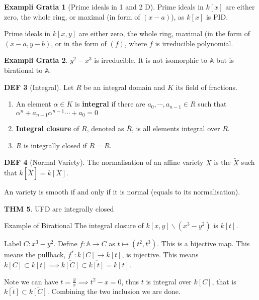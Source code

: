 \documentclass[twocolumn]{article}
\renewcommand{\emph}[1]{{\color{blue!70!black}\sffamily\bfseries #1}}
\newcommand{\A}{\mathbb{A}}
\theoremstyle{definition}
\newtheorem{thm}{THM}
\newtheorem{example}[thm]{Exampli Gratia}
\newtheorem{defi}[thm]{DEF}
\theoremstyle{remark}
\begin{document}
\begin{example}[Prime ideals in 1 and 2 D]
	Prime ideals in $k[x]$ are either zero, the whole ring, or maximal (in form of $(x-a)$), as $k[x]$ is PID.

	Prime ideals in $k[x,y]$  are either zero, the whole ring, maximal (in the form of $(x-a, y-b)$, or in the form of $(f)$, where $f$ is irreducible polynomial.
\end{example}

\begin{example}
	$y^2 - x^3$ is irreducible. It is not isomorphic to $\A$ but is birational to $\A$.
\end{example}

\begin{defi}[Integral]
	Let $R$ be an integral domain and $K$ its field of fractions.
	\begin{enumerate}
		\item An element $\alpha \in K$ is \emph{integral} if there are $a_0, \cdots, a_{n-1} \in R$ such that $\alpha^n + a_{n-1}\alpha^{n-1} \cdots + a_0 = 0$
		\item \emph{Integral closure} of $R$, denoted as $\overline{R}$, is all elements integral over $R$.
		\item $R$ is integrally closed if $\overline{R} = R$.
	\end{enumerate}
\end{defi}

\begin{defi}[Normal Variety]
	The normalisation of an affine variety $X$ is the $\tilde{X}$ such that $k[\tilde{X}] = \overline{k[X]}$.

	An variety is smooth if and only if it is normal (equals to its normalisation).
\end{defi}

\begin{thm}UFD are integrally closed \end{thm}

\begin{eg}{Example of Birational}{}
	The integral closure of $k[x,y] \backslash (x^3 - y^2)$ is $k[t]$.

	\tcblower
	Label $C: x^3 - y^2$. 
	Define $f: \A \rightarrow C$ as $t \mapsto (t^2, t^3)$. This is a bijective map. This means the pullback, $f^*: k[C] \rightarrow k[t]$, is injective. 
	This means $k[C] \subset k[t] \implies \overline{k[C]} \subset \overline{k[t]} = k[t]$.

	Note we can have $t = \frac{y}{x} \implies t^2 - x = 0$, thus $t$ is integral over $k[C]$, that is $\overline{k[t]} \subset \overline{k[C]}$.
	Combining the two inclusion we are done.
\end{eg}
\end{document}
